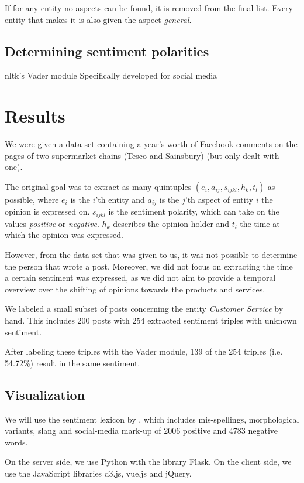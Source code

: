 \documentclass[10pt,a4paper]{article}
\begin{document}
		If for any entity no aspects can be found, it is removed from the final list. Every entity that makes it is also given the aspect \textit{general}.

		\subsection{Determining sentiment polarities}
		nltk's Vader module
		Specifically developed for social media

	\section{Results}
		We were given a data set containing a year's worth of Facebook comments on the pages of two supermarket chains (Tesco and Sainsbury) (but only dealt with one).

		The original goal was to extract as many quintuples $(e_i, a_{ij}, s_{ijkl}, h_k, t_l)$ as possible, where $e_i$ is the $i$'th entity and $a_{ij}$ is the $j$'th aspect of entity $i$ the opinion is expressed on. $s_{ijkl}$ is the sentiment polarity, which can take on the values \textit{positive} or \textit{negative}. $h_k$ describes the opinion holder and $t_l$ the time at which the opinion was expressed.

		However, from the data set that was given to us, it was not possible to determine the person that wrote a post. Moreover, we did not focus on extracting the time a certain sentiment was expressed, as we did not aim to provide a temporal overview over the shifting of opinions towards the products and services.

		We labeled a small subset of posts concerning the entity \textit{Customer Service} by hand. This includes 200 posts with 254 extracted sentiment triples with unknown sentiment.

		After labeling these triples with the Vader module, 139 of the 254 triples (i.e. 54.72\%) result in the same sentiment.

		\subsection{Visualization}
		We will use the sentiment lexicon by \cite{Hu:2004:MSC:1014052.1014073}, which includes mis-spellings, morphological variants, slang and social-media mark-up of 2006 positive and 4783 negative words.

		On the server side, we use Python with the library Flask. On the client side, we use the JavaScript libraries d3.js, vue.js and jQuery.
	
\end{document}
